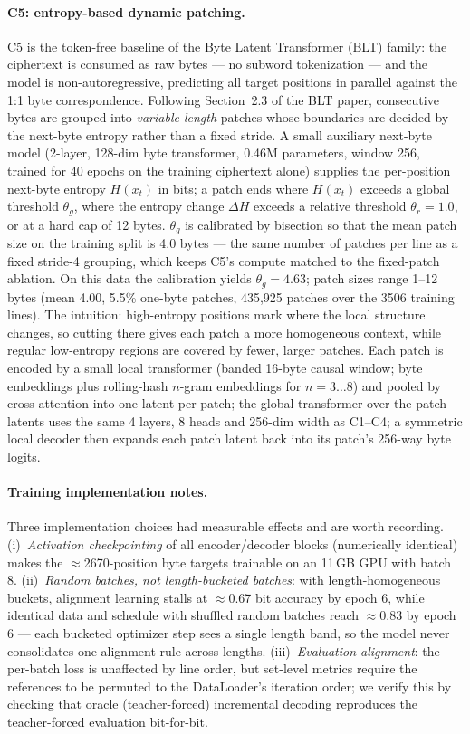 \documentclass[11pt]{article}
\begin{document}
\paragraph{C5: entropy-based dynamic patching.}
C5 is the token-free baseline of the Byte Latent Transformer (BLT) family: the
ciphertext is consumed as raw bytes --- no subword tokenization --- and the model
is non-autoregressive, predicting all target positions in parallel against the
1:1 byte correspondence. Following Section~2.3 of the BLT paper, consecutive
bytes are grouped into \emph{variable-length} patches whose boundaries are
decided by the next-byte entropy rather than a fixed stride. A small auxiliary
next-byte model (2-layer, 128-dim byte transformer, 0.46M parameters, window
256, trained for 40 epochs on the training ciphertext alone) supplies the
per-position next-byte entropy $H(x_t)$ in bits; a patch ends where $H(x_t)$
exceeds a global threshold $\theta_g$, where the entropy change $\Delta H$ exceeds
a relative threshold $\theta_r{=}1.0$, or at a hard cap of 12 bytes.
$\theta_g$ is calibrated by bisection so that the mean patch size on the
training split is 4.0 bytes --- the same number of patches per line as a fixed
stride-4 grouping, which keeps C5's compute matched to the fixed-patch
ablation. On this data the calibration yields $\theta_g{=}4.63$; patch sizes
range 1--12 bytes (mean 4.00, 5.5\% one-byte patches, 435{,}925 patches over the
3506 training lines). The intuition: high-entropy positions mark where the
local structure changes, so cutting there gives each patch a more homogeneous
context, while regular low-entropy regions are covered by fewer, larger patches.
Each patch is encoded by a small local transformer (banded 16-byte causal
window; byte embeddings plus rolling-hash $n$-gram embeddings for
$n{=}3\ldots8$) and pooled by cross-attention into one latent per patch; the
global transformer over the patch latents uses the same 4 layers, 8 heads and
256-dim width as C1--C4; a symmetric local decoder then expands each patch
latent back into its patch's 256-way byte logits.

\paragraph{Training implementation notes.}
Three implementation choices had measurable effects and are worth recording.
(i)~\emph{Activation checkpointing} of all encoder/decoder blocks (numerically
identical) makes the $\approx$2670-position byte targets trainable on an 11\,GB
GPU with batch 8. (ii)~\emph{Random batches, not length-bucketed batches}:
with length-homogeneous buckets, alignment learning stalls at $\approx$0.67 bit
accuracy by epoch 6, while identical data and schedule with shuffled random
batches reach $\approx$0.83 by epoch 6 --- each bucketed optimizer step sees a
single length band, so the model never consolidates one alignment rule across
lengths. (iii)~\emph{Evaluation alignment}: the per-batch loss is unaffected by
line order, but set-level metrics require the references to be permuted to the
DataLoader's iteration order; we verify this by checking that oracle
(teacher-forced) incremental decoding reproduces the teacher-forced evaluation
bit-for-bit.
\end{document}
